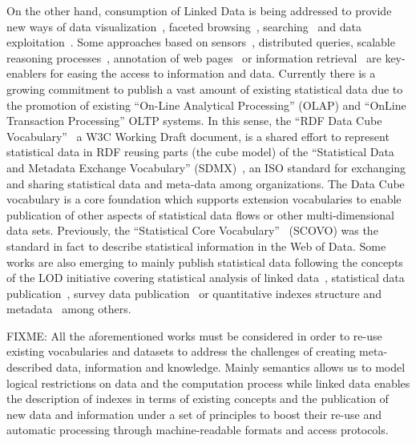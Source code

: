 On the other hand, consumption of Linked Data is being addressed to provide new ways of data 
visualization~\cite{DBLP:journals/semweb/DadzieR11,hoga-etal-2011-swse-JWS}, faceted browsing~\cite{Pietriga06fresnel,citeulike:8529753}, 
searching~\cite{hoga-etal-2011-swse-JWS} and data exploitation~\cite{Harth:2011:SIP:1963192.1963318}. Some approaches 
based on sensors~\cite{Jeung:2010:EMM:1850003.1850235,ontology-search}, distributed queries\cite{Hartig09executingsparql,Ankolekar07thetwo,sparqlOpt}, 
scalable reasoning processes~\cite{DBLP:journals/ws/UrbaniKMHB12,DBLP:journals/ws/BonattiHPS11}, 
annotation of web pages~\cite{rdfa-primer} or information retrieval~\cite{Pound} are key-enablers for easing the access 
to information and data. Currently there is a growing commitment to publish a vast amount of existing statistical data due to 
the promotion of existing ``On-Line Analytical Processing'' (OLAP) and ``OnLine Transaction Processing'' OLTP systems. 
In this sense, the ``RDF Data Cube Vocabulary''~\cite{rdf-data-cube} a W3C Working Draft document, is a shared effort to 
represent statistical data in RDF reusing parts (the cube model) of the ``Statistical Data and Metadata Exchange Vocabulary'' (SDMX)~\cite{sdmx}, an ISO standard 
for exchanging and sharing statistical data and meta-data among organizations. The Data Cube vocabulary is a core 
foundation which supports extension vocabularies to enable publication of other aspects of statistical data flows or 
other multi-dimensional data sets. Previously, the ``Statistical Core Vocabulary''~\cite{scovo} (SCOVO) was the standard in 
fact to describe statistical information in the Web of Data. Some works are also emerging to mainly publish statistical data 
following the concepts of the LOD initiative covering statistical analysis of linked data~\cite{DBLP:conf/semweb/ZapilkoM11}, 
statistical data publication~\cite{DBLP:journals/ijsc/SalasMBCMA12}, survey data publication~\cite{DDI2013,DBLP:conf/dgo/FernandezMG11} or 
quantitative indexes structure and metadata~\cite{webindexlod} among others.

FIXME: All the aforementioned works must be considered in order to re-use existing vocabularies and datasets to address 
the challenges of creating meta-described data, information and knowledge. Mainly semantics allows us to model logical restrictions 
on data and the computation process while linked data enables the description of indexes in terms of existing concepts and 
the publication of new data and information under a set of principles to boost their re-use and automatic 
processing through machine-readable formats and access protocols.


